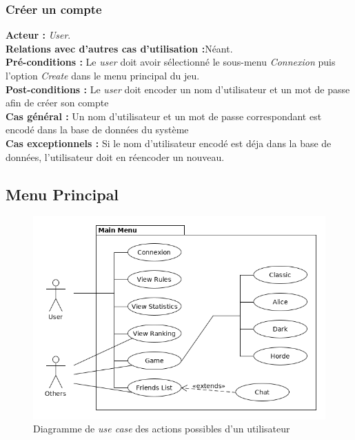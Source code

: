 \documentclass[10pt, a4paper]{article}
\begin{document}
\subsubsection{Créer un compte}
\textbf{Acteur :} \textit{User}.\\
\textbf{Relations avec d'autres cas d'utilisation :}Néant.\\
\textbf{Pré-conditions :} Le \textit{user} doit avoir sélectionné le sous-menu \textit{Connexion} puis l'option {\itshape Create} dans le menu principal du jeu.\\
\textbf{Post-conditions :} Le \textit{user} doit encoder un nom d'utilisateur et un mot de passe afin de créer son compte\\
\textbf{Cas général :} Un nom d'utilisateur et un mot de passe correspondant est encodé dans la base de données du système\\
\textbf{Cas exceptionnels :} Si le nom d'utilisateur encodé est déja dans la base de données, l'utilisateur doit en réencoder un nouveau.



\subsection{Menu Principal}

\begin{figure}[ht]
\begin{center}
\includegraphics[scale=0.5]{UC_mainmenu.png}
\caption{Diagramme de \textit{use case} des actions possibles d'un utilisateur}
\label{UC_menu} %
\end{center}
\end{figure}
\end{document}
